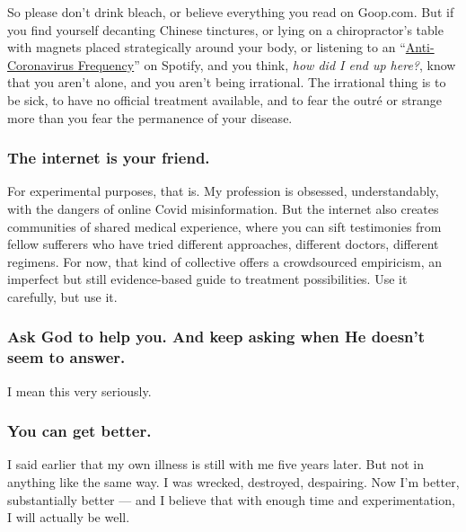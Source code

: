 So please don't drink bleach, or believe everything you read on
Goop.com. But if you find yourself decanting Chinese tinctures, or lying
on a chiropractor's table with magnets placed strategically around your
body, or listening to an
``\href{https://open.spotify.com/album/6ypeVM7NafQtp8IX3ZpctL}{Anti-Coronavirus
Frequency}'' on Spotify, and you think, \emph{how did I end up here?},
know that you aren't alone, and you aren't being irrational. The
irrational thing is to be sick, to have no official treatment available,
and to fear the outré or strange more than you fear the permanence of
your disease.

\hypertarget{the-internet-is-your-friend}{%
\subsubsection{\texorpdfstring{\textbf{The internet is your
friend.}}{The internet is your friend.}}\label{the-internet-is-your-friend}}

For experimental purposes, that is. My profession is obsessed,
understandably, with the dangers of online Covid misinformation. But the
internet also creates communities of shared medical experience, where
you can sift testimonies from fellow sufferers who have tried different
approaches, different doctors, different regimens. For now, that kind of
collective offers a crowdsourced empiricism, an imperfect but still
evidence-based guide to treatment possibilities. Use it carefully, but
use it.

\hypertarget{ask-god-to-help-you-and-keep-asking-when-he-doesnt-seem-to-answer}{%
\subsubsection{\texorpdfstring{\textbf{Ask God to help you. And keep
asking when He doesn't seem to
answer.}}{Ask God to help you. And keep asking when He doesn't seem to answer.}}\label{ask-god-to-help-you-and-keep-asking-when-he-doesnt-seem-to-answer}}

I mean this very seriously.

\hypertarget{you-can-get-better}{%
\subsubsection{\texorpdfstring{\textbf{You can get
better.}}{You can get better.}}\label{you-can-get-better}}

I said earlier that my own illness is still with me five years later.
But not in anything like the same way. I was wrecked, destroyed,
despairing. Now I'm better, substantially better --- and I believe that
with enough time and experimentation, I will actually be well.

